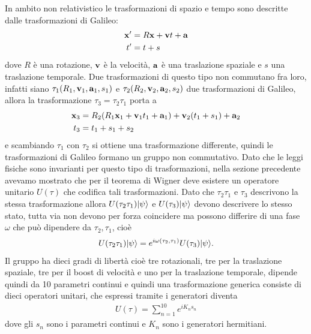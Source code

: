 In ambito non relativistico le trasformazioni di spazio e tempo sono descritte dalle trasformazioni di Galileo:
\begin{align*}
  \mathbf{x}' &= R \mathbf{x} + \mathbf{v} t + \mathbf{a}
  \\
  t' &= t + s
\end{align*}
dove $ R $ è una rotazione, $ \mathbf{v} $ è la velocità, $ \mathbf{a} $ è una traslazione spaziale e $ s $ una traslazione temporale. Due trasformazioni di questo 
tipo non commutano fra loro, infatti siano $ \tau_1(R_1,\mathbf{v}_1, \mathbf{a}_1, s_1) $ e $ \tau_2(R_2,\mathbf{v}_2, \mathbf{a}_2, s_2) $ due trasformazioni di Galileo, 
allora la trasformazione $ \tau_3 = \tau_2 \tau_1 $ porta a 
\begin{align*}
  \mathbf{x}_3 &= R_2 (R_1 \mathbf{x}_1 + \mathbf{v}_1 t_1 + \mathbf{a}_1) + \mathbf{v}_2 (t_1 + s_1) + \mathbf{a}_2 
  \\
  t_3 &= t_1 + s_1 + s_2
\end{align*}
e scambiando $ \tau_1 $ con $ \tau_2 $ si ottiene una trasformazione differente, quindi le trasformazioni di Galileo formano un gruppo non commutativo. 
Dato che le leggi fisiche sono invarianti per questo tipo di trasformazioni, nella sezione precedente avevamo mostrato che per il teorema di Wigner deve 
esistere un operatore unitario $ U(\tau) $ che codifica tali trasformazioni. Dato che $ \tau_2 \tau_1 $ e $ \tau_3 $ descrivono la stessa trasformazione 
allora $ U(\tau_2\tau_1)\vert \psi \rangle $ e $ U(\tau_3)\vert \psi \rangle $ devono descrivere lo stesso stato, tutta via non devono per forza coincidere ma possono 
differire di una fase $ \omega $ che può dipendere da $ \tau_2, \tau_1 $, cioè
\begin{align*}
  U(\tau_2\tau_1)\vert \psi \rangle = e^{i\omega(\tau_2,\tau_1)} U(\tau_3) \vert \psi \rangle.
\end{align*}
Il gruppo ha dieci gradi di libertà cioè tre rotazionali, tre per la traslazione spaziale, tre per il boost di velocità e uno per la traslazione temporale, 
dipende quindi da 10 parametri continui e quindi una trasformazione generica consiste di dieci operatori unitari, che espressi tramite i generatori diventa 
\begin{align*}
  U(\tau) = \sum_{n = 1}^{10} e^{i K_n s_n}
\end{align*}
dove gli $ s_n $ sono i parametri continui e $ K_n $ sono i generatori hermitiani. 

